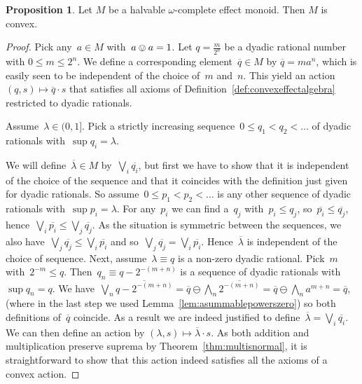 \documentclass[10pt,conference]{IEEEtran}
\newcommand{\cl}{\overline}
\newcounter{counter}
\theoremstyle{definition}
\newtheorem{proposition}[counter]{Proposition}
\begin{document}
\begin{proposition}\label{prop:dircompleteisconvex}
    Let $M$ be a halvable $\omega$-complete effect monoid.
        Then $M$ is convex.
\end{proposition}
\begin{proof}
    Pick any~$a \in M$ with~$a \ovee a = 1$.
    Let $q = \frac{m}{2^n}$ be a dyadic rational number with $0\leq m\leq
    2^n$. We define a corresponding element~$\cl{q} \in M$  by
        $\cl{q} = m a^n$, which is easily seen to be independent
        of the choice of~$m$ and~$n$.
    This yield an action~$(q, s) \mapsto \cl{q} \cdot s$ that satisfies
        all axioms of Definition~\ref{def:convexeffectalgebra}
        restricted to dyadic rationals.
    
    Assume~$\lambda \in (0,1]$.
    Pick a strictly increasing
        sequence~${0\leq q_1< q_2<\ldots}$ of dyadic rationals
        with~$\sup q_i = \lambda$.

        We will define~$\cl\lambda \in M$ by~$\bigvee_i \cl {q_i}$,
            but first we have to show that it is independent
                of the choice of the sequence
                    and that it coincides with the definition
                    just given for dyadic rationals.
        So assume~$0 \leq p_1 < p_2 < \ldots$
                is any other sequence of dyadic rationals
                with~$\sup p_i=\lambda$.
    For any~$p_i$ we can find a~$q_j$ with~$p_i \leq q_j$,
        so~$\cl {p_i} \leq \cl {q_j}$, hence~$\bigvee_i \cl{p_i}
                \leq \bigvee_j \cl{q_j}$.
        As the situation is symmetric between the sequences,
            we also have~$\bigvee_j \cl{q_j} \leq \bigvee_i \cl{p_i}$
            and so~$\bigvee_j \cl{q_j} = \bigvee_i \cl{p_i}$.
        Hence~$\cl \lambda$ is independent of the choice of sequence.
    Next, assume~$\lambda \equiv q$ is a non-zero dyadic rational.
    Pick~$m$ with~$2^{-m} \leq q$.
    Then~$q_n \equiv q - {2^{-(m+n)}}$
        is a sequence of dyadic rationals with~$\sup q_n = q$.
    We have~$\bigvee_n \cl {q - 2^{-(m+n)}}
                    = \cl q \ominus \bigwedge_n \cl{2^{-(m+n)}}
                    = \cl q \ominus \bigwedge_n a^{m+n}
                    = \cl q $,
                    (where in the last step we used Lemma~\ref{lem:asummablepowerszero}) so both definitions of~$\cl q$ coincide.
        As a result we are indeed justified
            to define~$\overline\lambda = \bigvee_i \cl {q_i}$.
 We can then define an action by $(\lambda, s)\mapsto \cl{\lambda}\cdot s$.
 As both addition and multiplication preserve suprema 
 by Theorem~\ref{thm:multisnormal}, it is straightforward to show 
 that this action indeed satisfies all the axioms of a convex action.
\end{proof}
\end{document}
